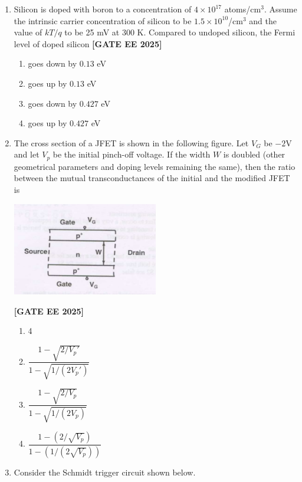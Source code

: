\documentclass[12pt,a4paper]{article}
\begin{document}
\begin{enumerate}[leftmargin=*, label=\textbf{Q.\arabic*:}]
\item Silicon is doped with boron to a concentration of $4 \times 10^{17}$ atoms/cm$^3$. Assume the intrinsic carrier concentration of silicon to be $1.5\times10^{10}$/cm$^3$ and the value of $kT/q$ to be 25 mV at 300 K. Compared to undoped silicon, the Fermi level of doped silicon
\newline
\noindent \textbf{[GATE EE 2025]}
\begin{enumerate}[label=(\Alph*)]
    \item goes down by $0.13$ eV
    \item goes up by $0.13$ eV
    \item goes down by $0.427$ eV
    \item goes up by $0.427$ eV
\end{enumerate}

\item The cross section of a JFET is shown in the following figure. Let $V_G$ be $-2$V and let $V_p$ be the initial pinch-off voltage. If the width $W$ is doubled (other geometrical parameters and doping levels remaining the same), then the ratio between the mutual transconductances of the initial and the modified JFET is

\begin{center}
\includegraphics[width=0.5\textwidth]{figs/q52.png}
\end{center}
\newline
\noindent \textbf{[GATE EE 2025]}
\begin{enumerate}[label=(\Alph*)]
    \item 4
    \item $\dfrac{1 - \sqrt{2/V_p'}}{1 - \sqrt{1/(2V_p')}}$
    \item $\dfrac{1 - \sqrt{2/V_p}}{1 - \sqrt{1/(2V_p)}}$
    \item $\dfrac{1 - (2/\sqrt{V_p})}{1 - (1/(2\sqrt{V_p}))}$
\end{enumerate}

\item Consider the Schmidt trigger circuit shown below.


\end{enumerate}
\end{document}
